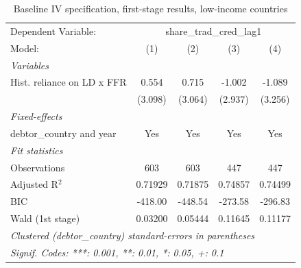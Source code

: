 
\begin{table}[htbp]
   \caption{\label{tab:results_baseline_iv_overall_1st-stage_lics} Baseline IV specification, first-stage results, low-income countries}
   \centering
   \begin{tabular}{lcccc}
      \tabularnewline \midrule \midrule
      Dependent Variable: & \multicolumn{4}{c}{share\_trad\_cred\_lag1}\\
      Model:                     & (1)     & (2)     & (3)     & (4)\\  
      \midrule
      \emph{Variables}\\
      Hist. reliance on LD x FFR & 0.554   & 0.715   & -1.002  & -1.089\\   
                                 & (3.098) & (3.064) & (2.937) & (3.256)\\   
      \midrule
      \emph{Fixed-effects}\\
      debtor\_country and year   & Yes     & Yes     & Yes     & Yes\\  
      \midrule
      \emph{Fit statistics}\\
      Observations               & 603     & 603     & 447     & 447\\  
      Adjusted R$^2$             & 0.71929 & 0.71875 & 0.74857 & 0.74499\\  
      BIC                        & -418.00 & -448.54 & -273.58 & -296.83\\  
      Wald (1st stage)           & 0.03200 & 0.05444 & 0.11645 & 0.11177\\  
      \midrule \midrule
      \multicolumn{5}{l}{\emph{Clustered (debtor\_country) standard-errors in parentheses}}\\
      \multicolumn{5}{l}{\emph{Signif. Codes: ***: 0.001, **: 0.01, *: 0.05, +: 0.1}}\\
   \end{tabular}
\end{table}


